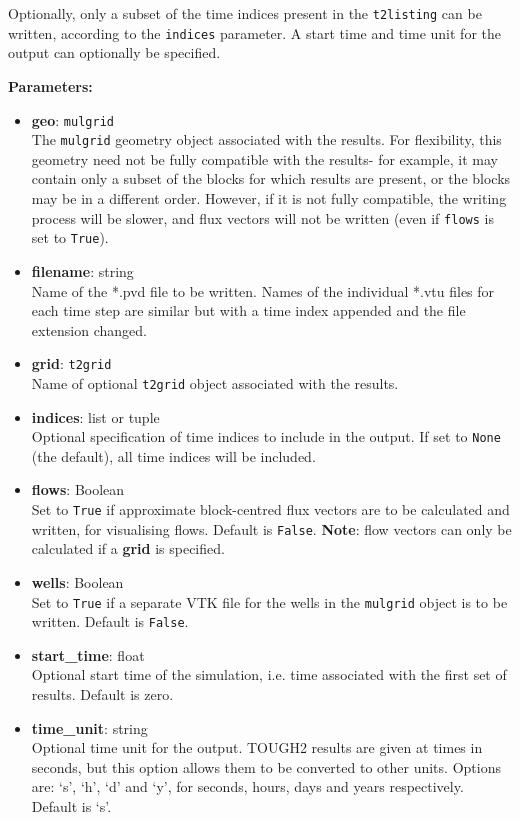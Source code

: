 Optionally, only a subset of the time indices present in the \texttt{t2listing} can be written, according to the \texttt{indices} parameter.  A start time and time unit for the output can optionally be specified.

\textbf{Parameters:}
\begin{itemize}
\item \textbf{geo}: \texttt{mulgrid}\\
  The \texttt{mulgrid} geometry object associated with the results.  For flexibility, this geometry need not be fully compatible with the results- for example, it may contain only a subset of the blocks for which results are present, or the blocks may be in a different order.  However, if it is not fully compatible, the writing process will be slower, and flux vectors will not be written (even if \texttt{flows} is set to \texttt{True}).
\item \textbf{filename}: string\\
  Name of the *.pvd file to be written.  Names of the individual *.vtu files for each time step are similar but with a time index appended and the file extension changed.
\item \textbf{grid}: \texttt{t2grid}\\
  Name of optional \texttt{t2grid} object associated with the results.
\item \textbf{indices}: list or tuple\\
  Optional specification of time indices to include in the output.  If set to \texttt{None} (the default), all time indices will be included.
\item \textbf{flows}: Boolean\\
  Set to \texttt{True} if approximate block-centred flux vectors are to be calculated and written, for visualising flows.  Default is \texttt{False}.  \textbf{Note}: flow vectors can only be calculated if a \textbf{grid} is specified.
\item \textbf{wells}: Boolean\\
  Set to \texttt{True} if a separate VTK file for the wells in the \texttt{mulgrid} object is to be written.  Default is \texttt{False}.
\item \textbf{start\_time}: float\\
  Optional start time of the simulation, i.e. time associated with the first set of results.  Default is zero.
\item \textbf{time\_unit}: string\\
  Optional time unit for the output.  TOUGH2 results are given at times in seconds, but this option allows them to be converted to other units.  Options are: `s', `h', `d' and `y', for seconds, hours, days and years respectively.  Default is `s'.
\end{itemize}

